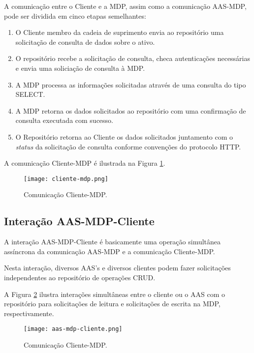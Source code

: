 	A comunicação entre o Cliente e a MDP, assim como a comunicação AAS-MDP, pode ser dividida em cinco etapas semelhantes:
	
	\begin{enumerate}
		\item O Cliente membro da cadeia de suprimento envia ao repositório uma solicitação de consulta de dados sobre o ativo.
		\item O repositório recebe a solicitação de consulta, checa autenticações necessárias e envia uma soliciação de consulta à MDP.
		\item A MDP processa as informações solicitadas através de uma consulta do tipo SELECT.
		\item A MDP retorna os dados solicitados ao repositório com uma confirmação de consulta executada com sucesso.
		\item O Repositório retorna ao Cliente os dados solicitados juntamento com o \textit{status} da solicitação de consulta conforme convenções do protocolo HTTP.
	\end{enumerate}
	
	
	A comunicação Cliente-MDP é ilustrada na Figura \ref{fig:cliente-mdp}.
	
	\begin{figure}[hbt!]
		\centering
		\caption{Comunicação Cliente-MDP.}
		\texttt{[image: cliente-mdp.png]}
		\label{fig:cliente-mdp}
	\end{figure}
	
	
	\subsection{Interação AAS-MDP-Cliente}
	
	A interação AAS-MDP-Cliente é basicamente uma operação simultânea assíncrona da comunicação AAS-MDP e a comunicação Cliente-MDP.
	
	Nesta interação, diversos AAS's e diversos clientes podem fazer solicitações independentes ao repositório de operações CRUD.
	
	A Figura \ref{fig:aas-mdp-cliente} ilustra interações simultâneas entre o cliente ou o AAS com o repositório para solicitações de leitura e solicitações de escrita na MDP, respectivamente.
	
	\begin{figure}[hbt!]
		\centering
		\caption{Comunicação Cliente-MDP.}
		\texttt{[image: aas-mdp-cliente.png]}
		\label{fig:aas-mdp-cliente}
	\end{figure}

